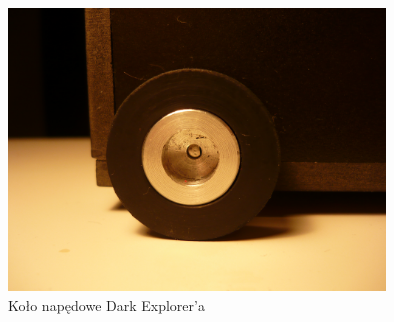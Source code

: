 \begin{figure}[!ht]
 \centering
 \includegraphics[height=75mm]{../images/ch02/wheel.jpg}
 \caption{Koło napędowe Dark Explorer'a}
 \label{fig:KmakWheel}
\end{figure}

